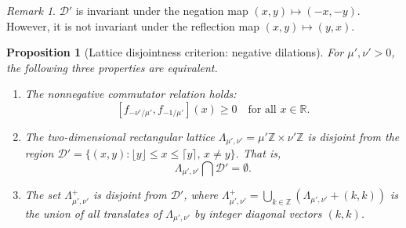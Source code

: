 \documentclass[11pt, letterpaper, reqno]{amsart}
\newtheorem{prop}[thm]{Proposition}
\theoremstyle{definition}
\theoremstyle{remark}
\newtheorem{rmk}[thm]{Remark}
\numberwithin{equation}{section}
\newcommand{\RR}{\ensuremath{\mathbb{R}}}
\newcommand{\ZZ}{\ensuremath{\mathbb{Z}}}
\newcommand{\floor}[1]{\lfloor{#1}\rfloor}
\newcommand{\ceil}[1]{\lceil{#1}\rceil}
\newcommand{\sfloor}[1]{\left\lfloor{#1}\right\rfloor^{'}}
\newcommand{\sceil}[1]{\left\lceil{#1}\right\rceil^{'}}
\newcommand{\uu}{{\mu'}}
\newcommand{\vv}{{\nu'}}
\newcommand{\cDprime}{{\mathcal{D}'}}
\DeclareMathOperator{\rowspan}{row.span}
\begin{document}
\begin{rmk}
$\cDprime$ is invariant under the negation map  $(x,y) \mapsto (-x, -y)$. 
However, it is not  invariant under the reflection map $(x,y) \mapsto (y,x)$.
\end{rmk}


\begin{prop}[Lattice disjointness criterion: negative dilations]
\label{prop:diagonal-neg}
For $\uu,\vv> 0$, the following three properties are equivalent. 
\begin{enumerate}
\item[\textnormal{(P1')}] The nonnegative commutator relation holds:
\[
[f_{-\vv/\uu}, f_{-1/\uu}](x) \geq 0 \quad \mbox{for all }  x \in \RR.
\]

\item[\textnormal{(P2')}] The two-dimensional rectangular lattice 
$ \Lambda_{\uu,\vv} = \uu \ZZ \times \vv\ZZ$ 
is disjoint from the region $\cDprime= \{ (x,y) : \floor{y} \leq x \leq \ceil{y},\, x\neq y \}$. 
That is,
\[
\Lambda_{\uu,\vv} \bigcap \cDprime = \emptyset.
\]

\item[\textnormal{(P3')}]
The set $\Lambda^+_{\uu,\vv}$ is disjoint from $\cDprime$,
where  $\Lambda_{\uu,\vv}^+ = \bigcup_{k\in \ZZ}\left( \Lambda_{\uu,\vv} + (k,k) \right) $
is the union of all 
translates of $\Lambda_{\uu,\vv}$ by  integer diagonal vectors $(k,k)$.
\end{enumerate}
\end{prop}
\end{document}
